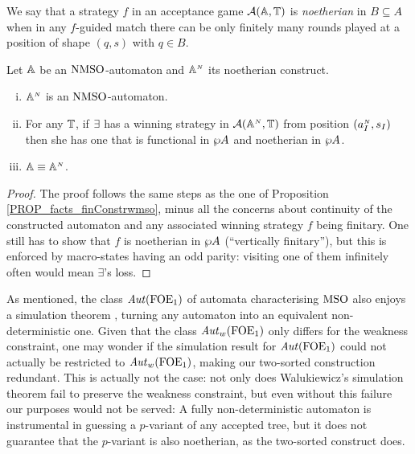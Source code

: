 \begin{definition}\label{def:noetherianstrategy}
We say that a strategy $f$ in an acceptance game $\mathcal{A}(\mathbb{A},\mathbb{T})$ is \emph{noetherian} in $B \subseteq A$ when in any $f$-guided match there can be only finitely many rounds played at a position of shape $(q,s)$ with $q \in B$.
\end{definition}


\begin{theorem}
\label{PROP_facts_noetConstr}
Let $\mathbb{A}$ be an $\mathrm{NMSO}$-automaton and $\mathbb{A}^{{\scriptscriptstyle N}}$ its noetherian construct.
\begin{enumerate}[(i)]
   pt
  \item $\mathbb{A}^{{\scriptscriptstyle N}}$ is an $\mathrm{NMSO}$-automaton.\label{point:finConstrAut}
  \item For any $\mathbb{T}$, if $\exists$ has a winning strategy in $\mathcal{A}(\mathbb{A}^{{\scriptscriptstyle N}},\mathbb{T})$ from position $(a_I^{{\scriptscriptstyle N}},s_I)$ then she has one that is functional in $\wp A$ and noetherian in $\wp A$.%
  \label{point:finConstrStrategy}
  \item $\mathbb{A} \equiv \mathbb{A}^{{\scriptscriptstyle N}}$. \label{point:finConstrEquiv}
  \end{enumerate}
\end{theorem}
\begin{proof}
The proof follows the same steps as the one of Proposition \ref{PROP_facts_finConstrwmso}, minus all the concerns about continuity of the constructed automaton and any associated winning strategy $f$ being finitary. One still has to show that $f$ is noetherian in $\wp A$ (``vertically finitary''), but this is enforced by macro-states having an odd parity: visiting one of them infinitely often would mean $\exists$'s loss.
\end{proof}

\begin{remark}
As mentioned, the class $\mathit{Aut}(\mathrm{FOE}_1)$ of automata characterising $\mathrm{MSO}$
\cite{Jan96} also enjoys a simulation theorem \cite{Walukiewicz96}, turning any
automaton into an equivalent non-deterministic one.
Given that the class $\mathit{Aut}_{w}(\mathrm{FOE}_1)$ only differs for the weakness constraint,
one may wonder if the simulation result for $\mathit{Aut}(\mathrm{FOE}_1)$ could not actually be
restricted to $\mathit{Aut}_{w}(\mathrm{FOE}_1)$, making our two-sorted construction redundant.
This is actually not the case: not only does Walukiewicz's simulation theorem
\cite{Walukiewicz96} fail to preserve the weakness constraint, but even without
this failure our purposes would not be served:
A fully non-deterministic automaton is instrumental in guessing a $p$-variant
of any accepted tree, but it does not guarantee that the $p$-variant is also
noetherian, as the two-sorted construct does.
\end{remark}


